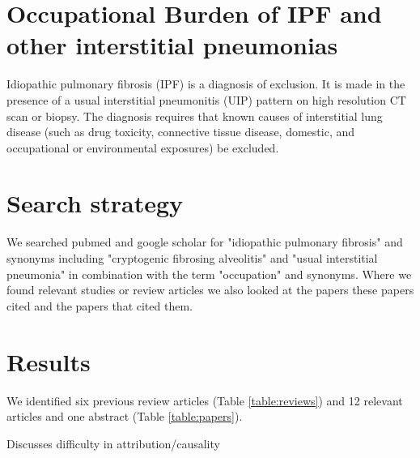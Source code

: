 \documentclass[a4paper,12pt]{article}
\author{Carl Reynolds \\
\small National Heart \& Lung Institute, Imperial College London }
\begin{document}


\section*{\centering Occupational Burden of IPF and other interstitial pneumonias}

Idiopathic pulmonary fibrosis (IPF) is a diagnosis of exclusion. It is made in the
presence of a usual interstitial pneumonitis (UIP) pattern on high resolution CT scan
or biopsy. The diagnosis requires that known causes of interstitial lung disease
(such as drug toxicity, connective tissue disease, domestic, and occupational or
environmental exposures) be excluded\cite{Travis2013}.



\section{Search strategy}

We searched pubmed and google scholar for "idiopathic pulmonary fibrosis" and synonyms including "cryptogenic fibrosing alveolitis" and "usual interstitial pneumonia" in combination with the term "occupation" and synonyms. Where we found relevant studies or review articles we also looked at the papers these papers cited and the papers that cited them. 

\section{Results}

We identified six previous review articles (Table \ref{table:reviews})\cite{Turner-Warwick1998} and 12 relevant articles and one abstract (Table \ref{table:papers}).

\cite{Turner-Warwick1998} Discusses difficulty in attribution/causality
\end{document}
